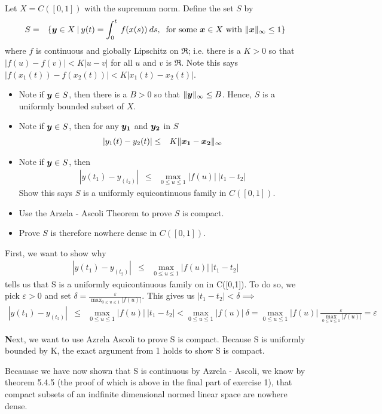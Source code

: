 \documentclass[11pt]{SelfArxOneColBMN}
\begin{document}
\begin{exercise}
Let $X = C([0,1])$ with the supremum norm.
Define the set $S$ by 
\begin{eqnarray*}
S &=& \{ \boldsymbol{y} \in X \: | \: y(t) = \int_0^t \: f(x(s)) \: ds, \: \text{ for some } \boldsymbol{x} \in X \text{ with } \|\boldsymbol{x}\|_\infty \leq 1 \}
\end{eqnarray*}
\noindent
where $f$ is continuous and globally Lipschitz on $\Re$; i.e. there is a $K > 0$ so that
$|f(u) - f(v)| < K |u - v|$ for all $u$ and $v$ is $\Re$.  Note this says
$|f(x_1(t)) - f(x_2(t))| < K|x_1(t) - x_2(t)|$.
\begin{itemize}
\item Note if $\boldsymbol{y} \in S$, then there is a $B > 0$ so that $\|\boldsymbol{y}\|_\infty \leq B $. Hence, $S$ is a uniformly bounded subset of $X$.
\item Note if $\boldsymbol{y} \in S$, then for any $\boldsymbol{y_1}$ and $\boldsymbol{y_2}$ in $S$
\begin{eqnarray*}
|y_1(t)-y_2(t)| &\leq& K \|\boldsymbol{x_1} - \boldsymbol{x_2}\|_\infty 
\end{eqnarray*}
\item Note if $\boldsymbol{y} \in S$, then
\begin{eqnarray*}
|y(t_1)-y_(t_2)| &\leq&   \max_{0 \leq u \leq 1} |f(u)| \: |t_1 - t_2|
\end{eqnarray*}
\noindent
Show this says $S$ is a uniformly equicontinuous family in $C([0,1])$.
\item Use the Arzela - Ascoli Theorem to prove $S$ is compact.
\item Prove $S$ is therefore nowhere dense in $C([0,1])$.
\end{itemize}
\end{exercise}

\begin{solution}
  First, we want to show why
  \begin{eqnarray*}
    |y(t_1)-y_(t_2)| &\leq&   \max_{0 \leq u \leq 1} |f(u)| \: |t_1 - t_2|
  \end{eqnarray*}
  tells us that S is a uniformly equicontinuous family on in C([0,1]). To do so, we pick $\varepsilon > 0$ and set $\delta = \frac{\varepsilon}{\max_{0 \leq u \leq 1} |f(u)|}$. This gives us $|t_1-t_2| < \delta \implies$
  \begin{eqnarray*}
    |y(t_1)-y_(t_2)| &\leq&   \max_{0 \leq u \leq 1} |f(u)| \: |t_1 - t_2| < \max_{0 \leq u \leq 1} |f(u)| \: \delta = \max_{0 \leq u \leq 1} |f(u)| \: \frac{\varepsilon}{\max_{0 \leq u \leq 1} |f(u)|} = \varepsilon
  \end{eqnarray*}
  \begin{center}
    \textbf Next, we want to use Azrela Ascoli to prove S is compact. Because S is uniformly bounded by K, the exact argument from 1 holds to show S is compact. 
  \end{center}
  Becauase we have now shown that S is continuous by Azrela - Ascoli, we know by theorem 5.4.5 (the proof of which is above in the final part of exercise 1), that compact subsets of an indfinite dimensional normed linear space are nowhere dense.
\end{solution}
\end{document}
